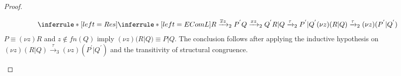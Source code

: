 \begin{theorem}
\begin{proof}
\begin{description}
\begin{itemize}
		\[
		  \inferrule* [left=Res]{
		    \inferrule* [left=EComL]{
			R \xrightarrow{\overline{x}z}_{2} P^{'}
		      \\
			Q \xrightarrow{xz}_{2} Q^{'}
		    }{
		      R|Q \xrightarrow{\tau}_{2} P^{'}|Q^{'}
		    }
		  }{
		    (\nu z)(R|Q) \xrightarrow{\tau}_{2} (\nu z)(P^{'}|Q^{'})
		  }
		\]
		$P \equiv (\nu z)R$ and $z \notin fn(Q)$ imply $(\nu z)(R|Q) \equiv P|Q$. The conclusion follows after applying the inductive hypothesis on $(\nu z)(R|Q) \xrightarrow{\tau}_{3} (\nu z)(P^{'}|Q^{'})$ and the transitivity of structural congruence.
	    \end{itemize}	    
	\end{description}
  \end{proof}
\end{theorem}



